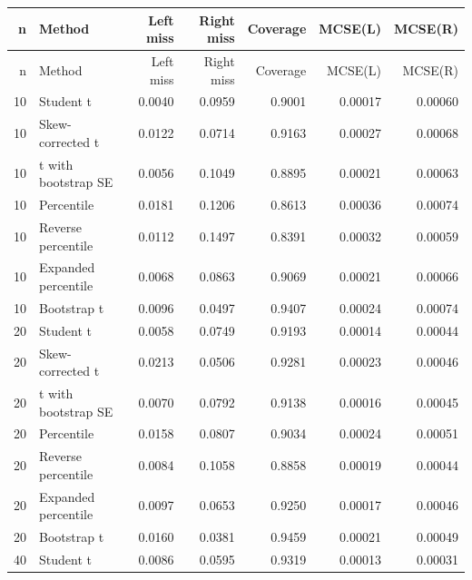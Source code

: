 {\scriptsize\setlength{\tabcolsep}{3pt}
\begin{longtable}{@{}rlrrrrr@{}}
\toprule

n & Method & Left miss & Right miss & Coverage & MCSE(L) & MCSE(R) \\
\midrule
\endfirsthead
\toprule
n & Method & Left miss & Right miss & Coverage & MCSE(L) & MCSE(R) \\
\midrule
\endhead

10 & Student t & 0.0040 & 0.0959 & 0.9001 & 0.00017 & 0.00060 \\

10 & Skew-corrected t & 0.0122 & 0.0714 & 0.9163 & 0.00027 & 0.00068 \\

10 & t with bootstrap SE & 0.0056 & 0.1049 & 0.8895 & 0.00021 & 0.00063 \\

10 & Percentile & 0.0181 & 0.1206 & 0.8613 & 0.00036 & 0.00074 \\

10 & Reverse percentile & 0.0112 & 0.1497 & 0.8391 & 0.00032 & 0.00059 \\

10 & Expanded percentile & 0.0068 & 0.0863 & 0.9069 & 0.00021 & 0.00066 \\

10 & Bootstrap t & 0.0096 & 0.0497 & 0.9407 & 0.00024 & 0.00074 \\

20 & Student t & 0.0058 & 0.0749 & 0.9193 & 0.00014 & 0.00044 \\

20 & Skew-corrected t & 0.0213 & 0.0506 & 0.9281 & 0.00023 & 0.00046 \\

20 & t with bootstrap SE & 0.0070 & 0.0792 & 0.9138 & 0.00016 & 0.00045 \\

20 & Percentile & 0.0158 & 0.0807 & 0.9034 & 0.00024 & 0.00051 \\

20 & Reverse percentile & 0.0084 & 0.1058 & 0.8858 & 0.00019 & 0.00044 \\

20 & Expanded percentile & 0.0097 & 0.0653 & 0.9250 & 0.00017 & 0.00046 \\

20 & Bootstrap t & 0.0160 & 0.0381 & 0.9459 & 0.00021 & 0.00049 \\

40 & Student t & 0.0086 & 0.0595 & 0.9319 & 0.00013 & 0.00031 \\


\end{longtable}}
